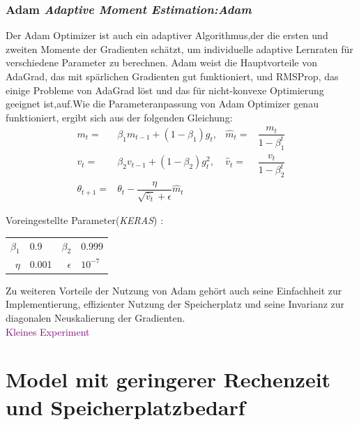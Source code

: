 \documentclass[12pt,a4paper]{scrartcl}
\numberwithin{equation}{section}
\begin{document}
\subsubsection{Adam \textit{Adaptive Moment Estimation:Adam}}
Der Adam\cite{adam} Optimizer ist auch ein adaptiver Algorithmus,der die ersten und zweiten Momente der Gradienten schätzt, um individuelle adaptive Lernraten für verschiedene Parameter zu berechnen.
 Adam weist die Hauptvorteile von AdaGrad, das mit spärlichen Gradienten gut funktioniert, und RMSProp, das einige Probleme von AdaGrad löst und das für nicht-konvexe Optimierung geeignet ist,auf.Wie die Parameteranpassung von Adam Optimizer genau funktioniert, ergibt sich aus der folgenden Gleichung: 
\begin{equation}\label{ADAM}
		\begin{aligned}
				m_{t}=& \beta_{1}m_{t-1}+(1-\beta_{1})g_{t}, &  \widehat{m}_{t} =& \dfrac{m_{t}}{1-\beta_{1}^t}\\
				v_{t}=& \beta_{2}v_{t-1}+(1-\beta_{2})g^2_t,&\widehat{v}_{t} =&\dfrac{v_t}{1-\beta_{2}^t}\\
				\theta_{t+1} =& \theta_{t} -\dfrac{\eta}{\sqrt{\widehat{v}_{t}}+\epsilon}\widehat{m}_{t}
			\end{aligned}
\end{equation}
\begin{center}
	Voreingestellte Parameter(\textit{KERAS}) :
	\begin{tabular}{r@{: }l r@{: }l}
		 $ \beta_{1}$ & 0.9 &$ \beta_{2} $& 0.999\\
		 $ \eta$& 0.001& $ \epsilon $ & $ 10^{-7} $
	\end{tabular}
\end{center}

Zu weiteren Vorteile der Nutzung von Adam gehört auch seine Einfachheit zur Implementierung, effizienter Nutzung der Speicherplatz und seine Invarianz zur diagonalen Neuskalierung der Gradienten.
\\ \textcolor{purple}{Kleines Experiment}
 \section{Model mit geringerer Rechenzeit und Speicherplatzbedarf}
\end{document}
